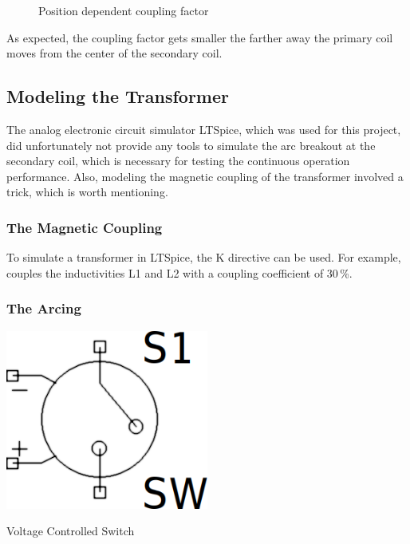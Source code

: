 \begin{figure}[h!]
    \centering
    \caption{Position dependent coupling factor}
    \label{fig:coupling-factor}
\end{figure}

As expected, the coupling factor gets smaller the farther away the primary coil moves from the center of the secondary coil.

\subsection{Modeling the Transformer}

The analog electronic circuit simulator LTSpice, which was used for this project, did unfortunately not provide any tools to simulate the arc breakout at the secondary coil, which is necessary for testing the continuous operation performance. Also, modeling the magnetic coupling of the transformer involved a trick, which is worth mentioning.

\subsubsection{The Magnetic Coupling}


To simulate a transformer in LTSpice, the K directive can be used. For example,  couples the inductivities L1 and L2 with a coupling coefficient of 30\,\%.

\subsubsection{The Arcing}

\begin{marginfigure}[5mm]
    \centering
    \includegraphics[width=0.5\textwidth]{simon/resources/ltspice_sw.png}
    \caption{Voltage Controlled Switch}
    \label{fig:ltspice_sw}
\end{marginfigure}


